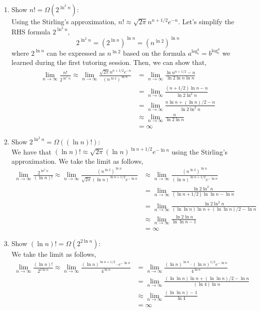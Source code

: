 \documentclass[11pt]{article}
\theoremstyle{definition}
\theoremstyle{theorem}
\begin{document}
\begin{enumerate}
\item Show $n! = \Omega(2^{\ln^2 n})$: \\
Using the Stirling's approximation, $n! \approx \sqrt{2 \pi} n^{n + 1/2} e^{-n}$. Let's simplify the RHS formula $2^{\ln^2 n}$,
\[
2^{\ln^2 n} = (2^{\ln n})^{\ln n} = (n^{\ln 2})^{\ln n}
\]
where $2^{\ln n}$ can be expressed as $n^{\ln 2}$ based on the formula $a^{\log_c^b} = b^{\log_c^a}$ we learned during the first tutoring session. Then, we can show that,
\[
\begin{split}
\lim_{n \to \infty} \frac{n!}{2^{\ln^2 n}} 
\approx \lim_{n \to \infty} \frac{\sqrt{2 \pi} n^{n + 1/2} e^{-n}}{(n^{\ln 2})^{\ln n}} 
&= \lim_{n \to \infty} \frac{\ln n^{n+1/2} - n}{\ln 2 \ln n \ln n} \\
&= \lim_{n \to \infty} \frac{(n+1/2) \ln n - n}{\ln 2 \ln^2 n} \\
&= \lim_{n \to \infty} \frac{n \ln n + (\ln n)/2 - n}{\ln 2 \ln^2 n} \\
&\approx \lim_{n \to \infty} \frac{n}{\ln 2 \ln n} \\
&= \infty
\end{split}
\]

\item Show $2^{\ln^2 n} = \Omega((\ln n)!)$: \\
We have that $(\ln n)! \approx \sqrt{2 \pi} (\ln n)^{\ln n + 1/2} e^{-\ln n}$ using the Stirling's approximation. We take the limit as follows,
\[
\begin{split}
\lim_{n \to \infty} \frac{2^{\ln^2 n}}{(\ln n)!} 
\approx \lim_{n \to \infty} \frac{(n^{\ln 2})^{\ln n}}{\sqrt{2 \pi} (\ln n)^{\ln n + 1/2} e^{-\ln n}} 
& \approx \lim_{n \to \infty} \frac{(n^{\ln 2})^{\ln n}}{(\ln n)^{\ln n + 1/2} e^{-\ln n}} \\
&= \lim_{n \to \infty} \frac{\ln 2 \ln^2 n}{(\ln n + 1/2) \ln \ln n - \ln n} \\
&= \lim_{n \to \infty} \frac{\ln 2 \ln^2 n}{(\ln \ln n) \ln n + (\ln \ln n)/2  - \ln n} \\
& \approx \lim_{n \to \infty} \frac{\ln 2 \ln n}{\ln \ln n  - 1} \\
&= \infty
\end{split}
\]

\item Show $(\ln n)! = \Omega(2^{2\ln n})$: \\
We take the limit as follows,
\[
\begin{split}
\lim_{n \to \infty} \frac{(\ln n)!}{2^{2\ln n}}
\approx \lim_{n \to \infty} \frac{(\ln n)^{\ln n + 1/2} \cdot e^{-\ln n}}{4^{\ln n}}
&= \lim_{n \to \infty} \frac{(\ln n)^{\ln n} \cdot (\ln n)^{1/2} e^{-\ln n}}{4^{\ln n}} \\
&= \lim_{n \to \infty} \frac{(\ln \ln n) \ln n + (\ln \ln n) / 2 -\ln n}{(\ln 4) \ln n} \\
& \approx \lim_{n \to \infty} \frac{(\ln \ln n) - 1}{\ln 4} \\
&= \infty
\end{split}
\]


\end{enumerate}
\end{document}
